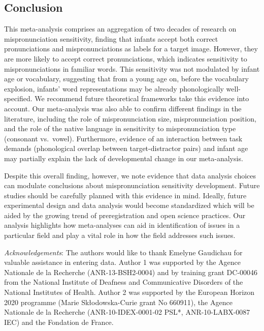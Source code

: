 \documentclass[man]{apa6}
\begin{document}
\hypertarget{conclusion}{%
\subsection{Conclusion}\label{conclusion}}

This meta-analysis comprises an aggregation of two decades of research on mispronunciation sensitivity, finding that infants accept both correct pronunciations and mispronunciations as labels for a target image. However, they are more likely to accept correct pronunciations, which indicates sensitivity to mispronunciations in familiar words. This sensitivity was not modulated by infant age or vocabulary, suggesting that from a young age on, before the vocabulary explosion, infants' word representations may be already phonologically well-specified. We recommend future theoretical frameworks take this evidence into account. Our meta-analysis was also able to confirm different findings in the literature, including the role of mispronunciation size, mispronunciation position, and the role of the native language in sensitivity to mispronunciation type (consonant vs.~vowel). Furthermore, evidence of an interaction between task demands (phonological overlap between target-distractor pairs) and infant age may partially explain the lack of developmental change in our meta-analysis.

Despite this overall finding, however, we note evidence that data analysis choices can modulate conclusions about mispronunciation sensitivity development. Future studies should be carefully planned with this evidence in mind. Ideally, future experimental design and data analysis would become standardized which will be aided by the growing trend of preregistration and open science practices. Our analysis highlights how meta-analyses can aid in identification of issues in a particular field and play a vital role in how the field addresses such issues.

\newpage

\emph{Acknowledgements}: The authors would like to thank Emelyne Gaudichau for valuable assistance in entering data. Author 1 was supported by the Agence Nationale de la Recherche (ANR-13-BSH2-0004) and by training grant DC-00046 from the National Institute of Deafness and Communicative Disorders of the National Institutes of Health. Author 2 was supported by the European Horizon 2020 programme (Marie Skłodowska-Curie grant No 660911), the Agence Nationale de la Recherche (ANR-10-IDEX-0001-02 PSL*, ANR-10-LABX-0087 IEC) and the Fondation de France.
\end{document}
